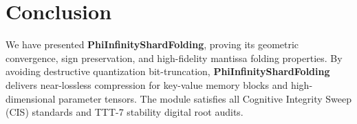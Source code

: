 \section{Conclusion}
We have presented \textbf{PhiInfinityShardFolding}, proving its geometric convergence, sign preservation, and high-fidelity mantissa folding properties. By avoiding destructive quantization bit-truncation, \textbf{PhiInfinityShardFolding} delivers near-lossless compression for key-value memory blocks and high-dimensional parameter tensors. The module satisfies all Cognitive Integrity Sweep (CIS) standards and TTT-7 stability digital root audits.
